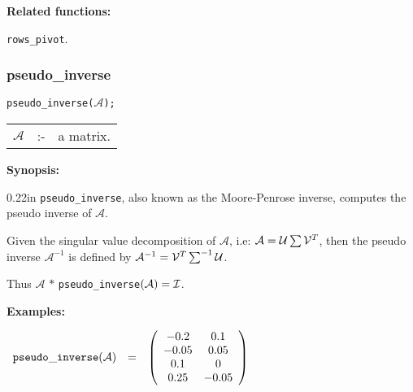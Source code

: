 {\bf Related functions:}

\hspace*{0.175in} {\tt rows\_pivot}.


\subsubsection{pseudo\_inverse}
\label{linalg:pseudo_inverse}

\hspace*{0.175in} {\tt pseudo\_inverse($\mathcal{A}$);}

\hspace*{0.1in}  
\begin{tabular}{l l l} 
$\mathcal{A}$ &:-& a matrix.
\end{tabular}

{\bf Synopsis:} %

\begin{addtolength}{\leftskip}{0.22in}
{\tt pseudo\_inverse}, also known as the Moore-Penrose inverse, computes
the pseudo inverse of $\mathcal{A}$. 

Given the singular value decomposition of $\mathcal{A}$, i.e: $\mathcal{A} = 
{\cal U} 
\sum {\cal V}^T$, then the pseudo inverse $\mathcal{A}^{-1}$ is defined 
by $\mathcal{A}^{-1} = {\cal V}^T \sum^{-1} {\cal U}$.

Thus $\mathcal{A}$ $ * $ {\tt pseudo\_inverse}$(\mathcal{A}) = {\cal I}$.

\end{addtolength}

{\bf Examples:}


\begin{flushleft}  
\hspace*{0.1in}
\begin{math}  
\begin{array}{ccc}
{\tt pseudo\_inverse}(\mathcal{A}) & = & 
        \left( \begin{array}{cc} -0.2 & 0.1 \\ -0.05 & 0.05 \\ 0.1 & 0 
\\ 0.25 & -0.05 
 \end{array} \right) 
\end{array}
\end{math}  
\end{flushleft}


